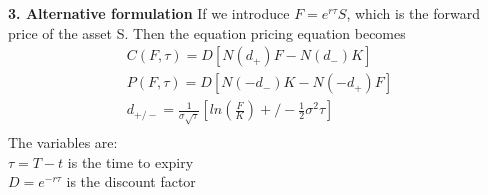 \documentclass[a4paper]{article}
\begin{document}
{\bf 3. Alternative formulation}
If we introduce $F = e^{r\tau} S$, which is the forward price of the asset S. Then the equation pricing equation becomes
\begin{align*}
	C(F,\tau)= D[N(d_+)F - N(d_-)K] \\
	P(F,\tau)= D[N(-d_-)K - N(-d_+)F] \\
	d_{+/-} = \frac{1}{\sigma \sqrt{\tau}}[ln(\frac{F}{K})+/-\frac{1}{2}\sigma^2 \tau] \\
\end{align*}
The variables are:\\
$\tau = T - t$ is the time to expiry\\
$D = e^{-r\tau}$ is the discount factor \\
\end{document}

